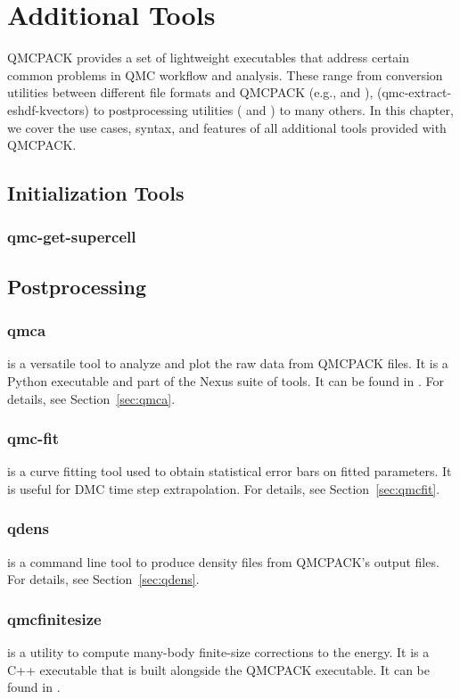 \chapter{Additional Tools}\label{chap:additional_tools}
QMCPACK provides a set of lightweight executables that address certain
common problems in QMC workflow and analysis.  These range from conversion utilities between 
different file formats and QMCPACK (e.g.,  and ),  
(qmc-extract-eshdf-kvectors) to postprocessing utilities ( and ) to many others.  In this chapter, we cover the use cases, syntax, and features of all additional tools provided with QMCPACK.  

\section{Initialization Tools}
  \subsection{qmc-get-supercell}

\section{Postprocessing}
  \subsection{qmca}
     is a versatile tool to analyze and plot the raw data from QMCPACK  files.
    It is a Python executable and part of the Nexus suite of tools.  It can be found in 
    . For details, see Section~\ref{sec:qmca}.
  \subsection{qmc-fit}
     is a curve fitting tool used to obtain statistical error bars on fitted parameters.
    It is useful for DMC time step extrapolation.  For details, see Section~\ref{sec:qmcfit}.
  \subsection{qdens}
     is a command line tool to produce density files from QMCPACK's  output files.  For details, see Section~\ref{sec:qdens}.
  \subsection{qmcfinitesize}
     is a utility to compute many-body finite-size corrections to the energy.  It
    is a C++ executable that is built alongside the QMCPACK executable.  It can be found in 
    .

